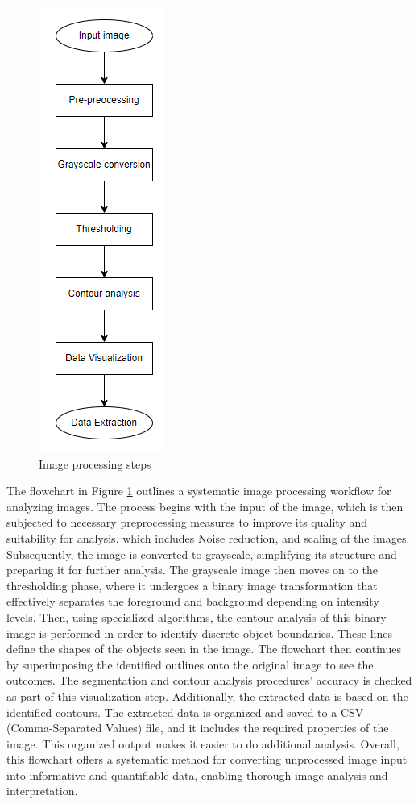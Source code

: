 \documentclass[a4paper,12pt]{report}%
\renewcommand{\\}{\vspace*{0.5\baselineskip} \newline}
\begin{document}
\begin{figure}[h]
\centering
	\includegraphics[scale=1.0]{images/image processing steps.png}\\
	\begin{footnotesize}
		\caption{Image processing steps}
		\label{Image processing steps}
	\end{footnotesize}
\end{figure}

\noindent The flowchart in Figure \ref{Image processing steps} outlines a systematic image processing workflow for analyzing images. The process begins with the input of the image, which is then subjected to necessary preprocessing measures to improve its quality and suitability for analysis. which includes Noise reduction, and scaling of the images. Subsequently, the image is converted to grayscale, simplifying its structure and preparing it for further analysis.
The grayscale image then moves on to the thresholding phase, where it undergoes a binary image transformation that effectively separates the foreground and background depending on intensity levels. Then, using specialized algorithms, the contour analysis of this binary image is performed in order to identify discrete object boundaries. These lines define the shapes of the objects seen in the image.
The flowchart then continues by superimposing the identified outlines onto the original image to see the outcomes. The segmentation and contour analysis procedures' accuracy is checked as part of this visualization step. Additionally, the extracted data is based on the identified contours.
The extracted data is organized and saved to a CSV (Comma-Separated Values) file, and it includes the required properties of the image. This organized output makes it easier to do additional analysis. Overall, this flowchart offers a systematic method for converting unprocessed image input into informative and quantifiable data, enabling thorough image analysis and interpretation.
\end{document}
